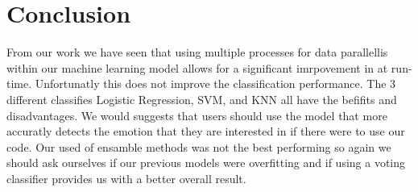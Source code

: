 \section{Conclusion}
\label{sec:conclusion}
From our work we have seen that using multiple processes
for data parallellis within our machine learning model allows for
a significant imrpovement in at run-time.
Unfortunatly this does not improve the classification performance.
The 3 different classifies Logistic Regression,
SVM, and KNN
all have the befifits and disadvantages.
We would suggests that users should use the model that more accuratly detects
the emotion that they are interested in if there were to use our code.
Our used of ensamble methods was not the best performing so again we should
ask ourselves if our previous models were overfitting and if using a voting
classifier provides us with a better overall result.
